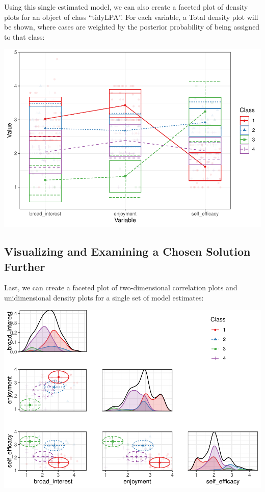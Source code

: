 \documentclass[man]{apa6}
\begin{document}
Using this single estimated model, we can also create a faceted plot of density plots for an object of class \enquote{tidyLPA}. For each variable, a Total density plot will be shown, where cases are weighted by the posterior probability of being assigned to that class:

\includegraphics{paper_files/figure-latex/unnamed-chunk-10-1.pdf}

\hypertarget{visualizing-and-examining-a-chosen-solution-further}{%
\subsection{Visualizing and Examining a Chosen Solution Further}\label{visualizing-and-examining-a-chosen-solution-further}}

Last, we can create a faceted plot of two-dimensional correlation plots and unidimensional density plots for a single set of model estimates:

\includegraphics{paper_files/figure-latex/unnamed-chunk-11-1.pdf}
\end{document}
